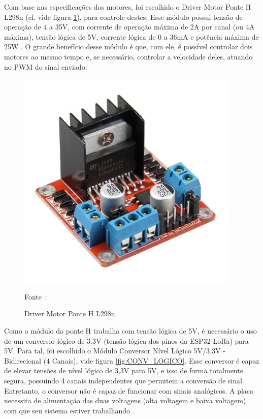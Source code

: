 Com base nas especificações dos motores, foi escolhido o Driver Motor Ponte H L298n (cf. vide figura \ref{fig:PonteH_modulo}), para controle destes. Esse módulo possui tensão de operação de 4 a 35V, com corrente de operação máxima de 2A por canal (ou 4A máxima), tensão lógica de 5V, corrente lógica de 0 a 36mA e potência máxima de 25W \cite{PonteH_Datasheet}. O grande benefício desse módulo é que, com ele, é possível controlar dois motores ao mesmo tempo e, se necessário, controlar a velocidade deles, atuando no PWM do sinal enviado.

\begin{figure}[H]
  \centering
  \includegraphics[scale=0.4]{figuras/ponteH_modulo.jpg}
  \caption{ Driver Motor Ponte H L298n.} 
  {\footnotesize Fonte : \cite{PonteH_mod}} 
  \label{fig:PonteH_modulo}
\end{figure}

Como o módulo da ponte H trabalha com tensão lógica de 5V, é necessário o uso de um conversor lógico de 3.3V (tensão lógica dos pinos da ESP32 LoRa) para 5V. Para tal, foi escolhido o Módulo Conversor Nível Lógico 5V/3.3V - Bidirecional (4 Canais), vide figura \ref{fig:CONV_LOGICO}. Esse conversor é capaz de elevar tensões de nível lógico de 3,3V para 5V, e isso de forma totalmente segura, possuindo 4 canais independentes que permitem a conversão de sinal. Entretanto, o conversor não é capaz de funcionar com sinais analógicos. A placa necessita de alimentação das duas voltagens (alta voltagem e baixa voltagem) com que seu sistema estiver trabalhando \cite{Conversor_logico}.


